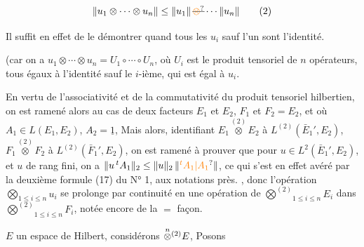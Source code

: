 \[
\|u_1\otimes\cdots\otimes u_n\|\leq\|u_1\|\,\deleted{\unsure{\otimes}}\cdots\|u_n\| \tag*{(2)}
\]

Il suffit en effet de le démontrer quand tous les $u_i$
sauf l'un sont l'identité. 

(car on a $u_1\otimes\cdots\otimes u_n=U_1\circ\cdots\circ U_n$, où $U_i$ est le
produit tensoriel de $n$ opérateurs, tous égaux à l'identité
sauf le $i$-ième, qui est égal à $u_i$. 


En vertu de l'associativité et de la commutativité du
produit tensoriel hilbertien, on  est ramené alors au cas de
deux facteurs $E_1$ et $E_2$, $F_1$ et $F_2=E_2$, et où $A_1\in L(E_1,E_2)$, $A_2=\underline1$,
Mais alors, identifiant $E_1\overset{(2)}{\otimes}E_2$ à $L^{(2)}(\bar E_1',E_2)$, $F_1\overset{(2)}{\otimes}F_2$ à
$L^{(2)}(\bar F_1',E_2)$,  on est ramené
à prouver que pour $u\in L^2(\bar E_1',E_2)$, et $u$ de rang fini,
on a $\|u\,{}^tA_1\|_2\leq\|u\|_2\,\|\unsure{{}^tA_1|A_1}\|$, ce qui s'est en effet
avéré par la  deuxième formule (17) du N° 1,
aux notations près. ,  
donc l'opération $\bigotimes_{1\leq i\leq n}u_i$  se  prolonge
par continuité en une opération de $\overset{(2)}{\bigotimes}_{1\leq i\leq n}E_i$ dans
$\overset{(2)}{\bigotimes}_{1\leq i\leq n}F_i$, notée encore de la $=$ façon. 

 $E$ un espace de Hilbert, considérons
$\overset{n}{\otimes}\vphantom{\otimes}^{(2)}E$,  Posons

